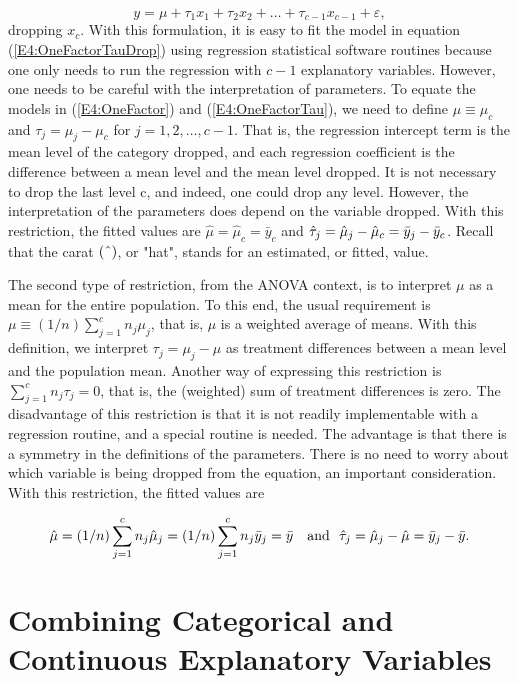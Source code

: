 \begin{equation}  \label{E4:OneFactorTauDrop}
y=\mu +\tau_1x_1+\tau_2x_2+\ldots +\tau _{c-1}x_{c-1}+\varepsilon,
\end{equation}%
dropping $x_{c}$. With this formulation, it is easy to fit the model
in equation (\ref{E4:OneFactorTauDrop}) using regression statistical
software routines because one only needs to run the regression with
$c-1$ explanatory variables. However, one needs to be careful with
the interpretation of parameters. To equate the models in
(\ref{E4:OneFactor}) and (\ref{E4:OneFactorTau}), we need to define
$\mu \equiv \mu_c$ and $\tau_{j}=\mu_{j}-\mu_c$ for $j=1,2,\ldots
,c-1$. That is, the regression intercept term is the mean level of
the category dropped, and each regression coefficient is the
difference between a mean level and the mean level dropped. It is
not necessary to drop the last level c, and indeed, one could drop
any level. However, the interpretation of the parameters does depend
on the variable dropped. With this restriction, the fitted values
are
$\hat{\mu}=\hat{\mu}_{c}=\bar{y}_{c}$ and $\hat{\tau}_{j}=\hat{\mu}_{j}-\hat{%
\mu}_{c}=\bar{y}_{j}-\bar{y}_{c}$. Recall that the carat $(\symbol{94})$, or
"hat", stands for an estimated, or fitted, value.

The second type of restriction, from the ANOVA context, is to
interpret $\mu $ as a mean for the entire population. To this end,
the usual requirement is $\mu \equiv
(1/n)\sum_{j=1}^{c}n_{j}\mu_{j}$, that is, $\mu $ is a weighted
average of means. With this definition, we interpret $\tau_{j}=\mu
_{j}-\mu $ as treatment differences between a mean level and the
population mean. Another way of expressing this restriction is
$\sum_{j=1}^{c}n_{j}\tau_{j}=0 $, that is, the (weighted) sum of
treatment differences is zero. The disadvantage of this restriction
is that it is not readily implementable with a regression routine,
and a special routine is needed. The advantage is that there is a
symmetry in the definitions of the parameters. There is no need to
worry about which variable is being dropped from the equation, an
important consideration. With this restriction, the fitted values
are

\begin{equation*}
\hat{\mu}=(1/n)\sum_{j=1}^{c}n_{j}\hat{\mu}_{j}=(1/n)\sum_{j=1}^{c}n_{j}\bar{%
y}_{j}=\bar{y}\text{ \ \ and \ }\hat{\tau}_{j}=\hat{\mu}_{j}-\hat{\mu}=\bar{y%
}_{j}-\bar{y}.
\end{equation*}

\section{Combining Categorical and Continuous Explanatory Variables}

